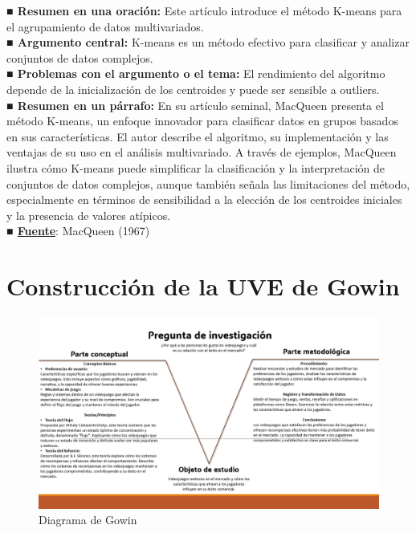 \documentclass[
  letterpaper,
  DIV=11,
  numbers=noendperiod]{scrreprt}
\begin{document}
\textbf{■ Resumen en una oración:} Este artículo introduce el método
K-means para el agrupamiento de datos multivariados.\\
\textbf{■ Argumento central:} K-means es un método efectivo para
clasificar y analizar conjuntos de datos complejos.\\
\textbf{■ Problemas con el argumento o el tema:} El rendimiento del
algoritmo depende de la inicialización de los centroides y puede ser
sensible a outliers.\\
\textbf{■ Resumen en un párrafo:} En su artículo seminal, MacQueen
presenta el método K-means, un enfoque innovador para clasificar datos
en grupos basados en sus características. El autor describe el
algoritmo, su implementación y las ventajas de su uso en el análisis
multivariado. A través de ejemplos, MacQueen ilustra cómo K-means puede
simplificar la clasificación y la interpretación de conjuntos de datos
complejos, aunque también señala las limitaciones del método,
especialmente en términos de sensibilidad a la elección de los
centroides iniciales y la presencia de valores atípicos.\\
\textbf{■
\href{https://projecteuclid.org/euclid.bsmsp/1200512992}{Fuente}}:
MacQueen (1967)

\section{Construcción de la UVE de
Gowin}\label{construcciuxf3n-de-la-uve-de-gowin}

\begin{figure}[H]

{\centering \includegraphics{imagenes/V-de-gowin.png}

}

\caption{Diagrama de Gowin}

\end{figure}%
\end{document}
